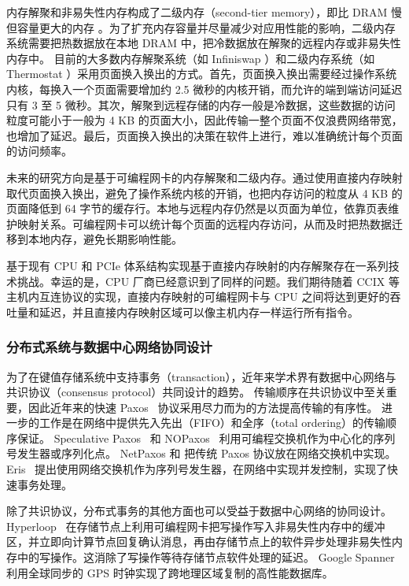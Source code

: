 内存解聚和非易失性内存构成了二级内存（second-tier memory），即比 DRAM 慢但容量更大的内存 \cite{dulloor2016data}。为了扩充内存容量并尽量减少对应用性能的影响，二级内存系统需要把热数据放在本地 DRAM 中，把冷数据放在解聚的远程内存或非易失性内存中。
目前的大多数内存解聚系统（如 Infiniswap \cite{gu2017efficient}）和二级内存系统（如 Thermostat \cite{agarwal2017thermostat}）采用页面换入换出的方式。首先，页面换入换出需要经过操作系统内核，每换入一个页面需要增加约 2.5 微秒的内核开销，而允许的端到端访问延迟只有 3 至 5 微秒。其次，解聚到远程存储的内存一般是冷数据，这些数据的访问粒度可能小于一般为 4 KB 的页面大小，因此传输一整个页面不仅浪费网络带宽，也增加了延迟。最后，页面换入换出的决策在软件上进行，难以准确统计每个页面的访问频率。

未来的研究方向是基于可编程网卡的内存解聚和二级内存。通过使用直接内存映射取代页面换入换出，避免了操作系统内核的开销，也把内存访问的粒度从 4 KB 的页面降低到 64 字节的缓存行。本地与远程内存仍然是以页面为单位，依靠页表维护映射关系。可编程网卡可以统计每个页面的远程内存访问，从而及时把热数据迁移到本地内存，避免长期影响性能。

基于现有 CPU 和 PCIe 体系结构实现基于直接内存映射的内存解聚存在一系列技术挑战。幸运的是，CPU 厂商已经意识到了同样的问题。我们期待随着 CCIX 等主机内互连协议的实现，直接内存映射的可编程网卡与 CPU 之间将达到更好的吞吐量和延迟，并且直接内存映射区域可以像主机内存一样运行所有指令。


\subsubsection{分布式系统与数据中心网络协同设计}
\label{future:system-network-codesign}


为了在键值存储系统中支持事务（transaction），近年来学术界有数据中心网络与共识协议（consensus protocol）共同设计的趋势。
传输顺序在共识协议中至关重要，因此近年来的快速 Paxos~\cite{lamport2006fast,kemme1999processing,moraru2013there,pedone1998optimistic} 协议采用尽力而为的方法提高传输的有序性。
进一步的工作是在网络中提供先入先出（FIFO）和全序（total ordering）的传输顺序保证。
Speculative Paxos~\cite{ports2015designing} 和 NOPaxos~\cite{li2016just} 利用可编程交换机作为中心化的序列号发生器或序列化点。
NetPaxos \cite{dang2015netpaxos,dang2016paxos} 和 \cite{dang2016network} 把传统 Paxos 协议放在网络交换机中实现。
Eris~\cite{eris} 提出使用网络交换机作为序列号发生器，在网络中实现并发控制，实现了快速事务处理。

除了共识协议，分布式事务的其他方面也可以受益于数据中心网络的协同设计。
Hyperloop~\cite{kim2018hyperloop} 在存储节点上利用可编程网卡把写操作写入非易失性内存中的缓冲区，并立即向计算节点回复确认消息，再由存储节点上的软件异步处理非易失性内存中的写操作。这消除了写操作等待存储节点软件处理的延迟。
Google Spanner~\cite{corbett2013spanner} 利用全球同步的 GPS 时钟实现了跨地理区域复制的高性能数据库。



